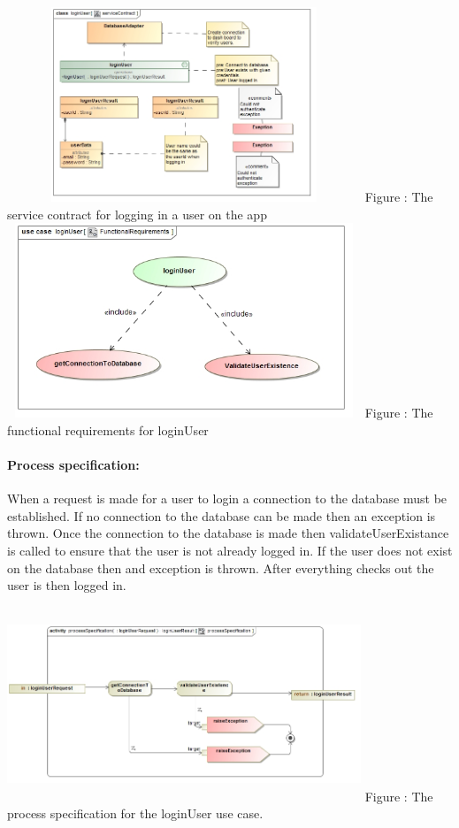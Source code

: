 \documentclass[hidelinks, 12pt, oneside]{article}
\begin{document}
\includegraphics[width=400px,height=220px]{img/serviceContractLoginUser.jpg}
		Figure : The service contract for logging in a user on the app\newline
\includegraphics[width=400px,height=220px]{img/functionalRequirementsLoginUser.jpg}
		Figure : The functional requirements for loginUser\newline		
		\newpage
		\paragraph{Process specification:}
		When a request is made for a user to login a connection to the database must be established. If no connection to the database can be made then an exception is thrown. Once the connection to the database is made then validateUserExistance is called to ensure that the user is not already logged in. If the user does not exist on the database then and exception is thrown. After everything checks out the user is then logged in.\newline\newline			
		
		\includegraphics[width=400px,height=220px]{img/processSpecificationLoginUser.jpg}
		Figure : The process specification for the loginUser use case.	
\end{document}
